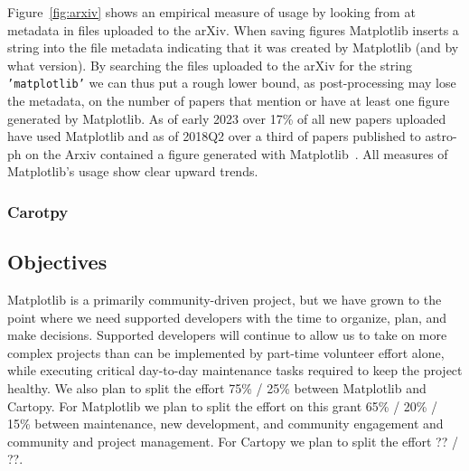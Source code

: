 \documentclass[12pt]{article}
\numberwithin{page}{section}
\begin{document}
Figure~\ref{fig:arxiv} shows an empirical measure of usage by looking from at
metadata in files uploaded to the arXiv.  When saving figures Matplotlib
inserts a string into the file metadata indicating that it was created by
Matplotlib (and by what version).  By searching the files uploaded to the arXiv
for the string \texttt{'matplotlib'} we can thus put a rough lower bound, as
post-processing may lose the metadata, on the number of papers that mention or
have at least one figure generated by Matplotlib.  As of early 2023 over 17\%
of all new papers uploaded have used Matplotlib and as of 2018Q2 over a third
of papers published to astro-ph on the Arxiv contained a figure generated with
Matplotlib~\cite{arxvi_stats}.  All measures of Matplotlib's usage show clear upward
trends.

\subsubsection{Carotpy}


\subsection{Objectives}


Matplotlib is a primarily community-driven project, but we have grown to the
point where we need supported developers with the time to organize, plan, and
make decisions.  Supported developers will continue to allow us to take on more
complex projects than can be implemented by part-time volunteer effort alone,
while executing critical day-to-day maintenance tasks required to keep the
project healthy.  We also plan to split the effort 75\% / 25\% between
Matplotlib and Cartopy.  For Matplotlib we plan to split the effort on this
grant 65\% / 20\% / 15\% between maintenance, new development, and community
engagement and community and project management.
For Cartopy we plan to split the effort ?? / ??.  %
\end{document}
